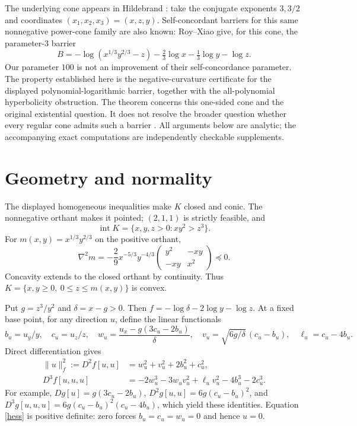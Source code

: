 \documentclass[11pt]{article}
\newcommand{\inter}{\operatorname{int}}
\begin{document}
The underlying cone appears in Hildebrand \cite[Theorem~3.2, family~5]{H}:
take the conjugate exponents $3,3/2$ and coordinates
$(x_1,x_2,x_3)=(x,z,y)$. Self-concordant barriers for this same nonnegative
power-cone family are also known: Roy--Xiao \cite[Theorem~2]{RX} give,
for this cone, the parameter-$3$ barrier
\[
 B=-\log(x^{1/3}y^{2/3}-z)-\tfrac23\log x-\tfrac13\log y-\log z.
\]
Our parameter $100$ is not an improvement of their self-concordance
parameter. The property established here is the negative-curvature
certificate for the displayed polynomial-logarithmic barrier, together
with the all-polynomial hyperbolicity obstruction. The theorem concerns this
one-sided cone and the original existential question. It does not resolve
the broader question whether every regular cone admits such a barrier
\cite[Section~6]{DTV}. All arguments below are analytic; the accompanying
exact computations are independently checkable supplements.

\section{Geometry and normality}
The displayed homogeneous inequalities make $K$ closed and conic. The
nonnegative orthant makes it pointed; $(2,1,1)$ is strictly feasible, and
\[
 \inter K=\{x,y,z>0:xy^2>z^3\}.
\]
For $m(x,y)=x^{1/3}y^{2/3}$ on the positive orthant,
\[
 \nabla^2m=-\frac29x^{-5/3}y^{-4/3}
 \begin{pmatrix}y^2&-xy\\-xy&x^2\end{pmatrix}\preceq0.
\]
Concavity extends to the closed orthant by continuity. Thus
$K=\{x,y\geq0,\ 0\leq z\leq m(x,y)\}$ is convex.

Put $g=z^3/y^2$ and $\delta=x-g>0$. Then
$f=-\log\delta-2\log y-\log z$. At a fixed base point, for any direction
$u$, define the linear functionals
\[
 b_u=u_y/y,\quad c_u=u_z/z,\quad
 w_u=\frac{u_x-g(3c_u-2b_u)}{\delta},\quad
 v_u=\sqrt{6g/\delta}\,(c_u-b_u),\quad \ell_u=c_u-4b_u.
\]
Direct differentiation gives
\begin{align}
 \|u\|_f^2:=D^2f[u,u]&=w_u^2+v_u^2+2b_u^2+c_u^2,\label{hess}\\
 D^3f[u,u,u]&=-2w_u^3-3w_uv_u^2+\ell_uv_u^2-4b_u^3-2c_u^3.\label{cubic}
\end{align}
For example, $Dg[u]=g(3c_u-2b_u)$,
$D^2g[u,u]=6g(c_u-b_u)^2$, and
$D^3g[u,u,u]=6g(c_u-b_u)^2(c_u-4b_u)$, which yield these identities.
Equation \eqref{hess} is positive definite: zero forces $b_u=c_u=w_u=0$
and hence $u=0$.
\end{document}
